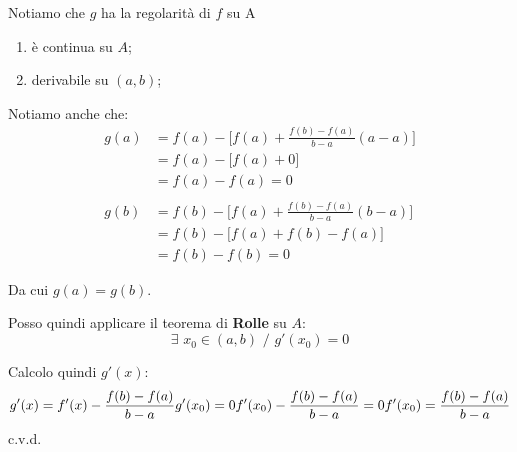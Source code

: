 \documentclass[../dimostrazioni]{subfiles}
\begin{document}
            Notiamo che \(g\) ha la regolarità di \(f\) su A
            \begin{enumerate}
                \indentitem \item è continua su \( A \);
                \indentitem \item derivabile su \( (a, b) \);
            \end{enumerate}

            Notiamo anche che:
            \begin{align*}
                g(a) &= f(a) - \bigg[f(a) + \frac{f(b) - f(a)}{b - a}(a - a) \bigg]\\
                     &= f(a) - \bigg[f(a) + 0 \bigg]\\
                     &= f(a) - f(a) = 0\\
                     \\
                g(b) &= f(b) - \bigg[f(a) + \frac{f(b) - f(a)}{b - a}(b - a) \bigg]\\
                     &= f(b) - \bigg[f(a) + f(b) - f(a) \bigg]\\
                     &= f(b) - f(b) = 0
            \end{align*}
            
            Da cui \( g(a) = g(b) \).

            Posso quindi applicare il teorema di \textbf{Rolle} su \( A \):
            \[
                \exists \, \, x_0 \in (a,b) \, \, / \, \, g'(x_0) = 0
            \]
            
            Calcolo quindi \( g'(x) \):
            \[
                g'(x) = f'(x) - \frac{f(b) - f(a)}{b-a}\\
                \\
                g'(x_0) = 0\\
                \\
                f'(x_0) - \frac{f(b) - f(a)}{b-a} = 0\\
                f'(x_0) = \frac{f(b) - f(a)}{b-a}
            \] c.v.d.
    
\end{document}
